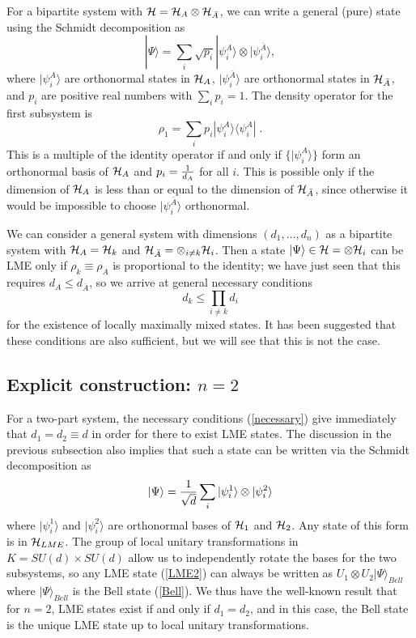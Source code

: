 \documentclass[12pt]{article}
\theoremstyle{definition}
\newcommand{\be}{\begin{equation}}
\newcommand{\ee}{\end{equation}}
\begin{document}
For a bipartite system with ${\cal H} = {\cal H}_A \otimes {\cal H}_{\bar{A}}$, we can write a general (pure) state using the Schmidt decomposition as
\be
|\Psi \rangle = \sum_i \sqrt{p_i} |\psi_i^A \rangle \otimes |\psi_i^{\bar{A}} \rangle,
\ee
where $|\psi_i^A\rangle$ are orthonormal states in ${\cal H}_A$, $|\psi_i^{\bar{A}} \rangle$ are orthonormal states in ${\cal H}_{\bar{A}}$, and $p_i$ are positive real numbers with $\sum_i p_i = 1$. The density operator for the first subsystem is
\be
\rho_1 = \sum_i p_i |\psi_i^A \rangle \langle \psi_i^A| \; .
\ee
This is a multiple of the identity operator if and only if $\{|\psi_i^A \rangle\}$ form an orthonormal basis of ${\cal H}_A$ and $p_i = {1 \over d_A}$ for all $i$. This is possible only if the dimension of ${\cal H}_A$ is less than or equal to the dimension of ${\cal H}_{\bar{A}}$, since otherwise it would be impossible to choose $|\psi_i^{\bar{A}} \rangle$ orthonormal.

We can consider a general system with dimensions $(d_1,\dots, d_n)$ as a bipartite system with ${\cal H}_A = {\cal H}_k$ and ${\cal H}_{\bar{A}} = \otimes_{i \ne k} {\cal H}_i$. Then a state $|\Psi \rangle \in {\cal H} = \otimes {\cal H}_i$ can be LME only if $\rho_k \equiv \rho_A$ is proportional to the identity; we have just seen that this requires $d_A \le d_{\bar{A}}$, so we arrive at general necessary conditions
\be
\label{necessary}
d_k \le \prod_{i \ne k} d_i
\ee
for the existence of locally maximally mixed states. It has been suggested that these conditions are also sufficient, but we will see that this is not the case.

\subsection{Explicit construction: $n=2$}

For a two-part system, the necessary conditions (\ref{necessary}) give immediately that $d_1 = d_2 \equiv d$ in order for there to exist LME states. The discussion in the previous subsection also implies that such a state can be written via the Schmidt decomposition as
\be
\label{LME2}
|\Psi \rangle = {1 \over \sqrt{d}} \sum_i |\psi_i^1 \rangle \otimes |\psi_i^2 \rangle
\ee
where $|\psi_i^1 \rangle$ and $|\psi_i^2 \rangle$ are orthonormal bases of ${\cal H}_1$ and ${\cal H}_2$. Any state of this form is in ${\cal H}_{LME}$. The group of local  unitary transformations in $K = SU(d) \times SU(d)$ allow us to independently rotate the bases for the two subsystems, so any LME state (\ref{LME2}) can always be written as $U_1 \otimes U_2 |\Psi \rangle_{Bell}$ where $|\Psi \rangle_{Bell}$ is the Bell state (\ref{Bell}). We thus have the well-known result that for $n=2$, LME states exist if and only if $d_1 = d_2$, and in this case, the Bell state is the unique LME state up to local unitary transformations.
\end{document}
